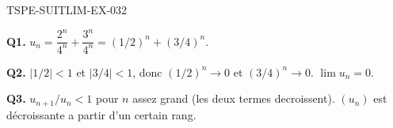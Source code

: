\begin{corrige}{TSPE-SUITLIM-EX-032}

\textbf{Q1.} $u_n = \dfrac{2^n}{4^n} + \dfrac{3^n}{4^n} = (1/2)^n + (3/4)^n$.

\textbf{Q2.} $|1/2|<1$ et $|3/4|<1$, donc $(1/2)^n \to 0$ et $(3/4)^n \to 0$. $\boxed{\lim u_n = 0}$.

\textbf{Q3.} $u_{n+1}/u_n < 1$ pour $n$ assez grand (les deux termes decroissent). $(u_n)$ est décroissante a partir d'un certain rang.

\end{corrige}
